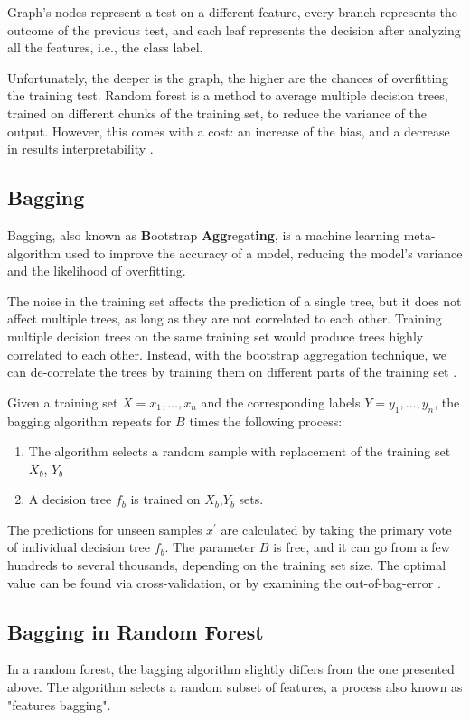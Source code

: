 Graph's nodes represent a test on a different feature, every branch represents the outcome of the previous test, and each leaf represents the decision after analyzing all the features, i.e., the class label. 

Unfortunately, the deeper is the graph, the higher are the chances of overfitting the training test.
Random forest is a method to average multiple decision trees, trained on different chunks of the training set, to reduce the variance of the output. However, this comes with a cost: an increase of the bias, and a decrease in results interpretability \cite{hastie2009elements}.
\subsection{Bagging}

Bagging, also known as \textbf{B}ootstrap \textbf{Agg}regat\textbf{ing}, is a machine learning meta-algorithm used to improve the accuracy of a model, reducing the model's variance and the likelihood of overfitting. 

The noise in the training set affects the prediction of a single tree, but it does not affect multiple trees, as long as they are not correlated to each other. Training multiple decision trees on the same training set would produce trees highly correlated to each other. Instead, with the bootstrap aggregation technique, we can de-correlate the trees by training them on different parts of the training set \cite{breiman1996bagging}.

Given a training set $X = x_1,\dots,x_n$ and the corresponding labels $Y = y_1, \dots, y_n$, the bagging algorithm repeats for $B$ times the following process:
\begin{enumerate}
	\item The algorithm selects a random sample with replacement of the training set $X_b$, $Y_b$
	\item A decision tree $f_b$ is trained on $X_b$,$Y_b$ sets.
\end{enumerate}


The predictions for unseen samples $x^\prime$ are calculated by taking the primary vote of individual decision tree $f_b$.
The parameter $B$ is free, and it can go from a few hundreds to several thousands, depending on the training set size. The optimal value can be found via cross-validation, or by examining the out-of-bag-error \cite{james2013introduction}.

\subsection{Bagging in Random Forest}
In a random forest, the bagging algorithm slightly differs from the one presented above. The algorithm selects a random subset of features, a process also known as "features bagging".

